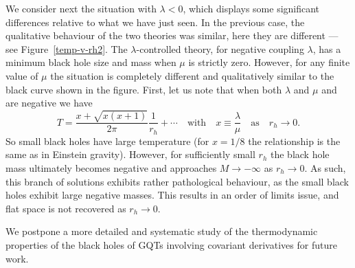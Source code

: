 \documentclass[11pt]{article}
\newcommand{\be}{\begin{equation}}
\newcommand{\ee}{\end{equation} }
\begin{document}
{We consider next the situation with $\lambda < 0$, which displays some significant differences relative to what we have just seen. In the previous case, the qualitative behaviour of the two theories was similar, here they are different --- see Figure~\ref{temp-v-rh2}. The $\lambda$-controlled theory, for negative coupling $\lambda$, has a minimum black hole size and mass when $\mu$ is strictly zero. However, for any finite value of $\mu$ the situation is completely different and qualitatively similar to the black curve shown in the figure. First, let us note that when both $\lambda$ and $\mu$ and  are negative we have
\be 
T = \frac{x + \sqrt{x(x+1)}}{2 \pi} \frac{1}{r_h} + \cdots  \quad \text{with} \quad x \equiv  \frac{\lambda}{\mu} \quad \text{as} \quad r_h \to 0. 
\ee
So small black holes have large temperature (for $x = 1/8$ the relationship is the same as in Einstein gravity). However, for sufficiently small $r_h$ the black hole mass ultimately becomes negative and approaches $M \to -\infty$ as $r_h \to 0$. As such, this branch of solutions exhibits rather pathological behaviour, as the small black holes exhibit large negative masses. This results in an order of limits issue, and flat space is not recovered as $r_h \to 0$. 

We postpone a more detailed and systematic study of the thermodynamic properties of the black holes of GQTs involving covariant derivatives for future work.





}
\end{document}
